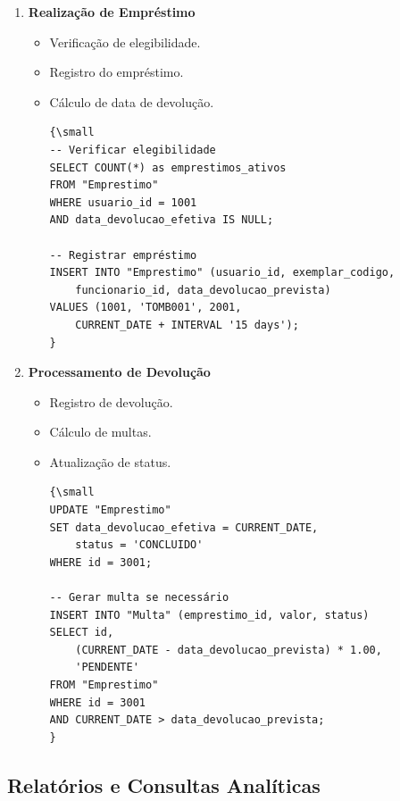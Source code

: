 \documentclass[12pt,a4paper]{article}
\begin{document}
\begin{tcolorbox}[title=Operações de Circulação]
\begin{enumerate}[label=\textbf{OC\arabic*.}]
    \item \textbf{Realização de Empréstimo}
    \begin{itemize}
        \item Verificação de elegibilidade.
        \item Registro do empréstimo.
        \item Cálculo de data de devolução.
        \begin{verbatim}
{\small
-- Verificar elegibilidade
SELECT COUNT(*) as emprestimos_ativos
FROM "Emprestimo"
WHERE usuario_id = 1001
AND data_devolucao_efetiva IS NULL;

-- Registrar empréstimo
INSERT INTO "Emprestimo" (usuario_id, exemplar_codigo,
    funcionario_id, data_devolucao_prevista)
VALUES (1001, 'TOMB001', 2001,
    CURRENT_DATE + INTERVAL '15 days');
}
        \end{verbatim}
    \end{itemize}

    \item \textbf{Processamento de Devolução}
    \begin{itemize}
        \item Registro de devolução.
        \item Cálculo de multas.
        \item Atualização de status.
        \begin{verbatim}
{\small
UPDATE "Emprestimo"
SET data_devolucao_efetiva = CURRENT_DATE,
    status = 'CONCLUIDO'
WHERE id = 3001;

-- Gerar multa se necessário
INSERT INTO "Multa" (emprestimo_id, valor, status)
SELECT id,
    (CURRENT_DATE - data_devolucao_prevista) * 1.00,
    'PENDENTE'
FROM "Emprestimo"
WHERE id = 3001
AND CURRENT_DATE > data_devolucao_prevista;
}
        \end{verbatim}
    \end{itemize}
\end{enumerate}
\end{tcolorbox}

\subsection{Relatórios e Consultas Analíticas}
\end{document}

